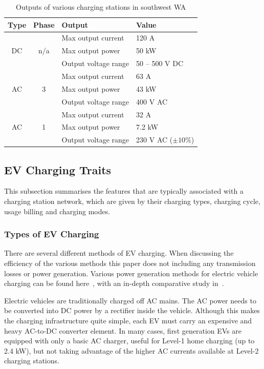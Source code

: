 
\begin{table}[H]
	\centering
	\caption{Outputs of various charging stations in southwest WA}
	\label{tbl:10:op}
	\begin{tabular}{ccll}
		\toprule
		Type & Phase & Output & Value \\
		\midrule
		\multirow{3}{*}{DC} & \multirow{3}{*}{n/a} & Max output current   & 120 A\\
		& & Max output power     & 50 kW          \\
		& & Output voltage range & 50 -- 500 V DC \\
		\midrule
		\multirow{3}{*}{AC} & \multirow{3}{*}{3} & Max output current   & 63 A     \\
		& & 	Max output power     & 43 kW   \\
		& &			Output voltage range & 400 V AC \\
		\midrule
		\multirow{3}{*}{AC} & \multirow{3}{*}{1} & Max output current   & 32 A     \\
		& &			Max output power     & 7.2 kW   \\
		& &			Output voltage range & 230 V AC ($\pm 10\%$)\\
		\bottomrule
	\end{tabular}
\end{table}

\subsection{EV Charging Traits}
\label{sec:10:evcharging}
This subsection summarises the features that are typically associated with a charging station network, which are given by their charging types, charging cycle, usage billing and charging modes.

\subsubsection{Types of EV Charging} %
There are several different methods of EV charging. When discussing the efficiency of the various methods this paper does not including any transmission losses or power generation. Various power generation methods for electric vehicle charging can be found here~\cite{speidel_leaving_2016, dell_towards_2014}, with an in-depth comparative study in~\cite{martinez-lao_electric_2017}.  

Electric vehicles are traditionally charged off AC mains. The AC power needs to be converted into DC power by a rectifier inside the vehicle. Although this makes the charging infrastructure quite simple, each EV must carry an expensive and heavy AC-to-DC converter element. In many cases, first generation EVs are equipped with only a basic AC charger, useful for Level-1 home charging (up to 2.4 kW), but not taking advantage of the higher AC currents available at Level-2 charging stations.

